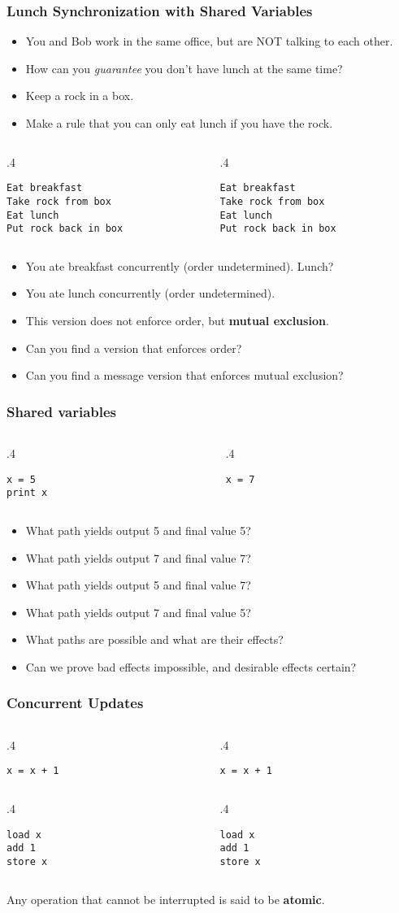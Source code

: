 \documentclass{beamer}
\newcommand{\bi}{\begin{itemize}}
\newcommand{\ii}{\item}
\newcommand{\ei}{\end{itemize}}
\newcommand{\bfr}[1]{\begin{frame}[fragile]\frametitle{{ #1 }}}
\newcommand{\cola}[1]{\begin{columns}\begin{column}{#1\textwidth}}
\newcommand{\colb}[1]{\end{column}\begin{column}{#1\textwidth}}
\newcommand{\colc}{\end{column}\end{columns}}
\begin{document}
\bfr{Lunch Synchronization with Shared Variables}
\bi
\ii You and Bob work in the same office, but are NOT talking to each other.
\ii How can you {\em guarantee} you don't have lunch at the same time?
\pause
\ii Keep a rock in a box.
\pause
\ii Make a rule that you can only eat lunch if you have the rock.
\pause
\ei
\cola{.4}
\begin{Verbatim}[label=You]
Eat breakfast
Take rock from box
Eat lunch
Put rock back in box
\end{Verbatim}
\colb{.4}
\begin{Verbatim}[label=Bob]
Eat breakfast
Take rock from box
Eat lunch
Put rock back in box
\end{Verbatim}
\colc
\pause
\bi
\ii You ate breakfast concurrently (order undetermined).  Lunch?
\pause
\ii You ate lunch concurrently (order undetermined).
\pause
\ii This version does not enforce order, but {\bf mutual exclusion}.
\pause
\ii Can you find a version that enforces order?
\pause
\ii Can you find a message version that enforces mutual exclusion?
\ei

\end{frame}

\bfr{Shared variables}
\cola{.4}
\begin{Verbatim}[label=Thread A]
x = 5
print x
\end{Verbatim}
\colb{.4}
\begin{Verbatim}[label=Thread B]
x = 7
\end{Verbatim}
\colc
\pause
\bi
\ii What path yields output 5 and final value 5?
\ii What path yields output 7 and final value 7?
\pause
\ii What path yields output 5 and final value 7?
\pause
\ii What path yields output 7 and final value 5?
\pause
\ii What paths are possible and what are their effects?
\ii Can we prove bad effects impossible, and desirable effects certain?
\ei

\end{frame}


\bfr{Concurrent Updates}
\vfill
\cola{.4}
\begin{Verbatim}[label=Thread A]
x = x + 1
\end{Verbatim}
\colb{.4}
\begin{Verbatim}[label=Thread B]
x = x + 1
\end{Verbatim}
\colc
\pause
\vfill
\cola{.4}
\begin{Verbatim}[label=Thread A]
load x
add 1
store x
\end{Verbatim}
\colb{.4}
\begin{Verbatim}[label=Thread B]
load x
add 1
store x
\end{Verbatim}
\colc

\pause
\vfill

Any operation that cannot be interrupted is said to be {\bf atomic}.

\end{frame}
\end{document}
